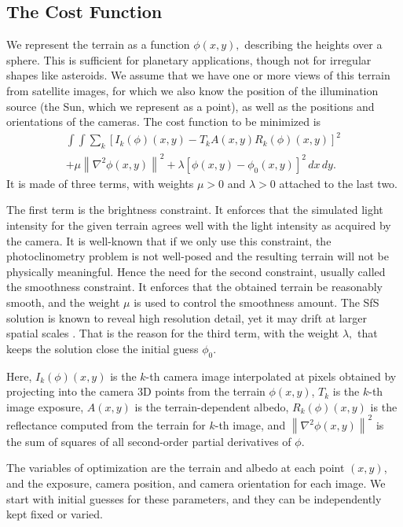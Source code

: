 \documentclass[12pt,oneside]{article}
\begin{document}
\subsection{The Cost Function}

We represent the terrain as a function $\phi(x, y),$ describing the heights
over a sphere. This is sufficient for planetary applications,
though not for irregular shapes like asteroids. We assume that we have
one or more views of this terrain from satellite images, for which we
also know the position of the illumination source (the Sun, which we
represent as a point), as well as the positions and orientations of the
cameras. The cost function to be minimized is
\begin{multline}\label{cost}
\int\!\! \int \! \sum_k \left[ I_k(\phi)(x, y) - T_k A(x, y)
 R_k(\phi)(x, y) \right]^2\,  \\
+ \mu \left\|\nabla^2 \phi(x, y) \right\|^2  
+ \lambda  \left[ \phi(x, y) - \phi_0(x, y) \right]^2
\, dx\, dy.
\end{multline}
It is made of three terms, with weights $\mu > 0$ and $\lambda > 0$
attached to the last two.

The first term is the brightness constraint. It enforces that the simulated light intensity
for the given terrain agrees well with the light intensity as acquired
by the camera. It is well-known that if we only use this constraint, the
photoclinometry problem is not well-posed \citet{horn1990height} and the
resulting terrain will not be physically meaningful. Hence the need for
the second constraint, usually called the smoothness constraint. It
enforces that the obtained terrain
be reasonably smooth, and the weight $\mu$ is used to control the
smoothness amount. The SfS solution is known to reveal high resolution
detail, yet it may drift at larger spatial scales \cite{grumpe2014construction}.
That is the reason for the third term, with the weight $\lambda,$ 
that keeps the solution close the initial guess $\phi_0.$ 

Here, $I_k(\phi)(x, y)$ is the $k$-th camera image interpolated at
pixels obtained by projecting into the camera 3D points from the terrain
$\phi(x, y)$, $T_k$ is the $k$-th image exposure, $A(x, y)$ is the
terrain-dependent albedo, $R_k(\phi)(x, y)$ is the reflectance computed
from the terrain for $k$-th image, and $\left\|\nabla^2 \phi(x, y) \right\|^2 $ is the sum
of squares of all second-order partial derivatives of $\phi.$

The variables of optimization are the terrain and albedo at each point
$(x, y)$, and the exposure, camera position, and camera orientation for
each image. We start with initial guesses for these parameters, and they
can be independently kept fixed or varied.
\end{document}

